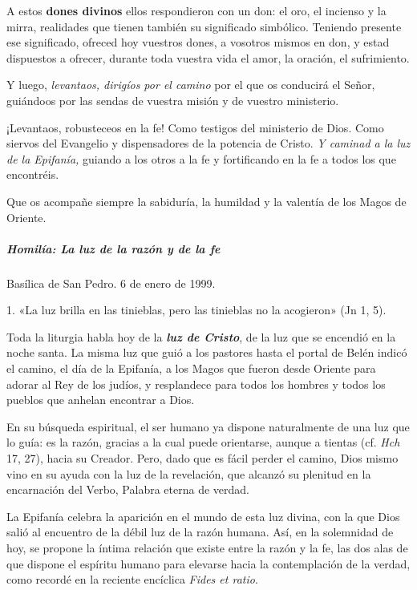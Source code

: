 \documentclass[]{article}
\let\oldsubparagraph\subparagraph
\renewcommand{\subparagraph}[1]{\oldsubparagraph{#1}\mbox{}}
\begin{document}
A estos \textbf{dones divinos} ellos respondieron con un don: el oro, el
incienso y la mirra, realidades que tienen también su significado
simbólico. Teniendo presente ese significado, ofreced hoy vuestros
dones, a vosotros mismos en don, y estad dispuestos a ofrecer, durante
toda vuestra vida el amor, la oración, el sufrimiento.

Y luego, \emph{levantaos, dirigíos por el camino} por el que os
conducirá el Señor, guiándoos por las sendas de vuestra misión y de
vuestro ministerio.

¡Levantaos, robusteceos en la fe! Como testigos del ministerio de Dios.
Como siervos del Evangelio y dispensadores de la potencia de Cristo.
\emph{Y caminad a la luz de la Epifanía,} guiando a los otros a la fe y
fortificando en la fe a todos los que encontréis.

Que os acompañe siempre la sabiduría, la humildad y la valentía de los
Magos de Oriente.

\subparagraph{Homilía: La luz de la razón y de la
fe}\label{homiluxeda-la-luz-de-la-razuxf3n-y-de-la-fe}

Basílica de San Pedro. 6 de enero de 1999.

1. «La luz brilla en las tinieblas, pero las tinieblas no la acogieron»
(Jn 1, 5).

Toda la liturgia habla hoy de la \emph{\textbf{luz de Cristo}}, de la
luz que se encendió en la noche santa. La misma luz que guió a los
pastores hasta el portal de Belén indicó el camino, el día de la
Epifanía, a los Magos que fueron desde Oriente para adorar al Rey de los
judíos, y resplandece para todos los hombres y todos los pueblos que
anhelan encontrar a Dios.

En su búsqueda espiritual, el ser humano ya dispone naturalmente de una
luz que lo guía: es la razón, gracias a la cual puede orientarse, aunque
a tientas (cf. \emph{Hch} 17, 27), hacia su Creador. Pero, dado que es
fácil perder el camino, Dios mismo vino en su ayuda con la luz de la
revelación, que alcanzó su plenitud en la encarnación del Verbo, Palabra
eterna de verdad.

La Epifanía celebra la aparición en el mundo de esta luz divina, con la
que Dios salió al encuentro de la débil luz de la razón humana. Así, en
la solemnidad de hoy, se propone la íntima relación que existe entre la
razón y la fe, las dos alas de que dispone el espíritu humano para
elevarse hacia la contemplación de la verdad, como recordé en la
reciente encíclica \emph{Fides et ratio}.
\end{document}
